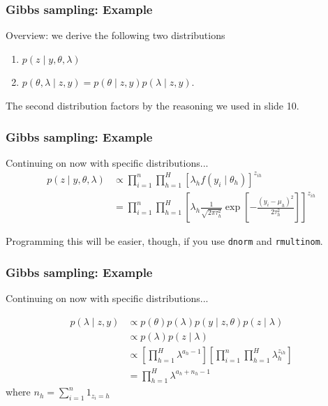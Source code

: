 \documentclass{beamer}
\begin{document}
\begin{frame}
\frametitle{Gibbs sampling: Example}

Overview: we derive the following two distributions
\begin{enumerate}
\item $p(z \mid y, \theta, \lambda) $
\item $p(\theta, \lambda \mid z, y) = p(\theta \mid z, y)p(\lambda \mid z, y)$.
\end{enumerate}
The second distribution factors by the reasoning we used in slide 10.


\end{frame}
\begin{frame}[fragile]
\frametitle{Gibbs sampling: Example}

Continuing on now with specific distributions...
\begin{align*}
p(z \mid y, \theta, \lambda) &\propto \prod_{i=1}^n \prod_{h=1}^H \left[ \lambda_h f(y_i \mid \theta_h)\right]^{z_{ih} } \\
&= \prod_{i=1}^n \prod_{h=1}^H \left[ \lambda_h \frac{1}{\sqrt{2\pi \tau^2_{h} }}\exp\left[-\frac{(y_i - \mu_{h} )^2 }{ 2\tau^2_{h} } \right] \right]^{z_{ih} }
\end{align*}

Programming this will be easier, though, if you use \verb|dnorm| and \verb|rmultinom|.

\end{frame}
\begin{frame}[fragile]
\frametitle{Gibbs sampling: Example}

Continuing on now with specific distributions...
\newline

\begin{align*}
p(\lambda \mid z, y) &\propto p(\theta)p(\lambda )p(y \mid z, \theta)p(z \mid \lambda) \\
&\propto p(\lambda )p(z \mid \lambda) \\
&\propto \left[\prod_{h=1}^H   \lambda^{a_h-1}\right] \left[\prod_{i=1}^n  \prod_{h=1}^H \lambda_h^{z_{ih}} \right] \\
&= \prod_{h=1}^H \lambda^{a_h + n_h -1}
\end{align*}
where $n_h = \sum_{i=1}^n 1_{z_{i} = h }$


\end{frame}
\end{document}
